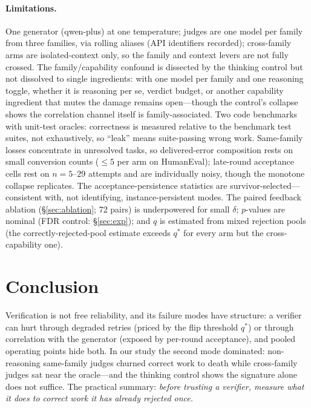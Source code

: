 \documentclass[10pt]{article}
\begin{document}
\paragraph{Limitations.}
One generator (qwen-plus) at one temperature; judges are one model
per family from three families, via rolling aliases (API
identifiers recorded);
cross-family arms are isolated-context only, so the family and
context levers are not fully crossed.  The family/capability
confound is dissected by the thinking control but not dissolved
to single ingredients: with one model per family and one
reasoning toggle, whether it is reasoning per se, verdict budget,
or another capability ingredient that mutes the damage remains
open---though the control's collapse shows the correlation
channel itself is family-associated.  Two code benchmarks with unit-test oracles:
correctness is measured relative to the benchmark test suites,
not exhaustively, so ``leak'' means suite-passing wrong work.
Same-family losses concentrate in unresolved tasks, so
delivered-error composition rests on small conversion counts
($\le 5$ per arm on HumanEval); late-round acceptance cells rest
on $n = 5$--$29$ attempts and are individually noisy, though the
monotone collapse replicates.  The acceptance-persistence statistics are
survivor-selected---consistent with, not identifying,
instance-persistent modes.  The paired feedback ablation
(§\ref{sec:ablation}; 72 pairs) is underpowered for small
$\delta$; $p$-values are nominal (FDR control: §\ref{sec:exp});
and $q$ is estimated from mixed rejection pools (the
correctly-rejected-pool estimate exceeds $q^\ast$ for every arm
but the cross-capability one).

\section{Conclusion}

Verification is not free reliability, and its failure modes have
structure: a verifier can hurt through degraded retries (priced by
the flip threshold $q^\ast$) or through correlation with the
generator (exposed by per-round acceptance), and pooled operating
points hide both.  In our study the second mode dominated: non-reasoning same-family
judges churned correct work to death while cross-family judges
sat near the oracle---and the thinking control shows the
signature alone does not suffice.  The practical summary:
\emph{before trusting a verifier, measure what it does to correct
work it has already rejected once.}
\end{document}

